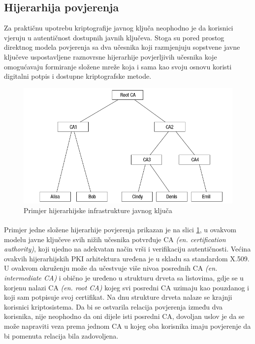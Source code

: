 \subsection{Hijerarhija povjerenja}
Za praktičnu upotrebu kriptografije javnog ključa neophodno je da korisnici vjeruju u autentičnost dostupnih javnih ključeva. Stoga su pored prostog direktnog modela povjerenja sa dva učesnika koji razmjenjuju sopstvene javne ključeve uspostavljene raznovrsne hijerarhije povjerljivih učesnika koje omogućavaju formiranje složene mreže koja i sama kao svoju osnovu koristi digitalni potpis i dostupne kriptografske metode.

\begin{figure}[H]
    \centering
    \includegraphics[width=1.0\textwidth]{material/pki}
    \caption{Primjer hijerarhijske infrastrukture javnog ključa}
    \label{fig:pki}
\end{figure}

\paragraph*{}
Primjer jedne složene hijerarhije povjerenja prikazan je na slici \ref{fig:pki}, u ovakvom modelu javne ključeve svih nižih učesnika potvrđuje CA \textit{(en. certification authority)}, koji ujedno na adekvatan način vrši i verifikaciju autentičnosti. Većina ovakvih hijerarhijskih PKI arhitektura uređena je u skladu sa standardom X.509. U ovakvom okruženju može da učestvuje više nivoa posrednih CA \textit{(en. intermediate CA)} i obično je uređeno u strukturu drveta sa listovima, gdje se u korjenu nalazi CA \textit{(en. root CA)} kojeg svi posredni CA uzimaju kao pouzdanog i koji sam potpisuje svoj certifikat. Na dnu strukture drveta nalaze se krajnji korisnici kriptosistema. Da bi se ostvarila relacija povjerenja između dva korisnika, nije neophodno da oni dijele isti posredni CA, dovoljan uslov je da se može napraviti veza prema jednom CA u kojeg oba korisnika imaju povjerenje da bi pomenuta relacija bila zadovoljena.

